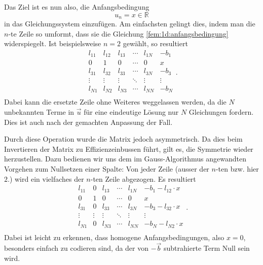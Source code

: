 Das Ziel ist es nun also, die Anfangsbedingung
\begin{equation}
    u_n = x \in \mathbb{R} 
    \label{fem:1d:anfangsbedingung}
\end{equation}
in das Gleichungssystem einzufügen.
Am einfachsten gelingt dies, indem man die $n$-te Zeile so umformt, dass sie die Gleichung \ref{fem:1d:anfangsbedingung} widerspiegelt.
Ist beispielsweise $n = 2$ gewählt, so resultiert
\begin{equation}
    \boxed{
        \begin{matrix}
            l_{11} & l_{12} & l_{13} & \cdots & l_{1N} & -b_1   \\
            0      & 1      & 0      & \cdots & 0      & x      \\
            l_{31} & l_{32} & l_{33} & \cdots & l_{3N} & -b_3   \\
            \vdots & \vdots & \vdots & \ddots & \vdots & \vdots \\
            l_{N1} & l_{N2} & l_{N3} & \cdots & l_{NN} & -b_N   \\
        \end{matrix}
    }.
\end{equation}
Dabei kann die ersetzte Zeile ohne Weiteres weggelassen werden, da die $N$ unbekannten Terme in $\vec{u}$ für eine eindeutige Lösung nur $N$ Gleichungen fordern. 
Dies ist auch nach der gemachten Anpassung der Fall.

Durch diese Operation wurde die Matrix jedoch asymmetrisch. Da dies beim Invertieren der Matrix zu Effizienzeinbussen führt, gilt es, die Symmetrie wieder herzustellen.
Dazu bedienen wir uns dem im Gauss-Algorithmus angewandten Vorgehen zum Nullsetzen einer Spalte: Von jeder Zeile (ausser der $n$-ten bzw. hier $2$.) wird ein vielfaches der $n$-ten Zeile abgezogen.
Es resultiert
\begin{equation}
    \boxed{
        \begin{matrix}
            l_{11} & 0      & l_{13} & \cdots & l_{1N} & -b_1 - l_{12} \cdot x \\
            0      & 1      & 0      & \cdots & 0      & x                     \\
            l_{31} & 0      & l_{33} & \cdots & l_{3N} & -b_3 - l_{32} \cdot x \\
            \vdots & \vdots & \vdots & \ddots & \vdots & \vdots                \\
            l_{N1} & 0      & l_{N3} & \cdots & l_{NN} & -b_N - l_{N2} \cdot x \\
        \end{matrix}
    }.
\end{equation}
Dabei ist leicht zu erkennen, dass homogene Anfangsbedingungen, also $x=0$, besonders einfach zu codieren sind, da der von $-\vec{b}$ subtrahierte Term Null sein wird.

